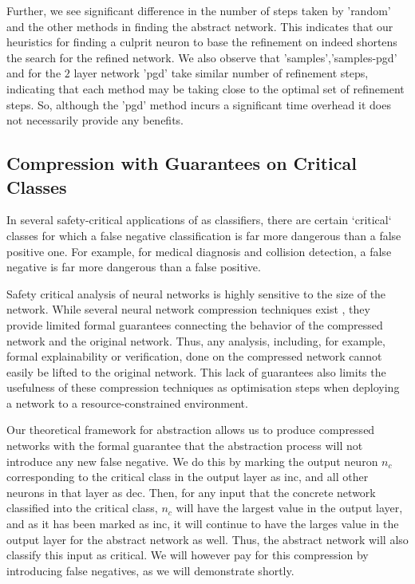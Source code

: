 Further, we see significant difference in the number of steps taken by 'random'
and the other methods in finding the abstract network. This indicates that our
heuristics for finding a culprit neuron to base the refinement on indeed
shortens the search for the refined network. We also observe that
'samples','samples-pgd' and for the $2$ layer network 'pgd' take similar number
of refinement steps, indicating that each method may be taking close to the
optimal set of refinement steps. So, although the 'pgd' method
incurs a significant time overhead  it does not necessarily
provide any benefits. 

\subsection{Compression with Guarantees on Critical Classes}

In several safety-critical applications of \dnn as classifiers, there are
certain `critical` classes for which a false negative classification is far more
dangerous than a false positive one. For example, for medical diagnosis and
collision detection, a false negative is far more dangerous than a false
positive.

Safety critical analysis of neural networks is highly sensitive to the size of
the network. While several neural network compression techniques exist
, they provide limited formal guarantees   connecting the behavior
of the compressed network and the original network. Thus, any analysis,
including, for example, formal explainability or verification, done on the
compressed network cannot easily be lifted to the original network. This lack of
guarantees also limits the usefulness of these compression techniques as
optimisation steps when deploying a network to a resource-constrained
environment. 

Our theoretical framework for abstraction allows us to produce compressed
networks with the formal guarantee that the abstraction process will not
introduce any new false negative. We do this by marking the output neuron $n_c$
corresponding to the critical class in the output layer as inc, and all other
neurons in that layer as dec.  Then, for any input that the concrete network
classified into the critical class, $n_c$ will have the largest value in the
output layer, and as it has been marked as inc, it will continue to have the
larges value in the output layer for the abstract network as well. Thus, the
abstract network will also classify this input as critical. We will however pay
for this compression by introducing false negatives, as we will demonstrate
shortly. 

